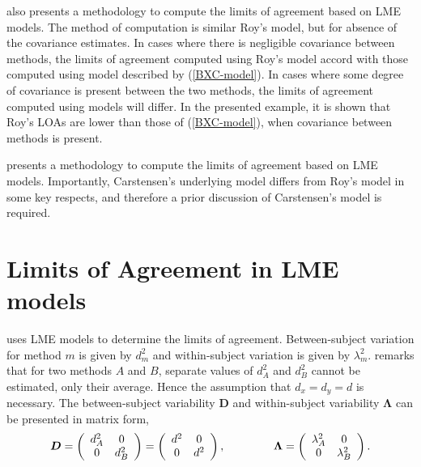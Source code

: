 \documentclass[12pt, a4paper]{report}
\theoremstyle{plain}
\theoremstyle{definition}
\theoremstyle{remark}
\begin{document}
\bigskip

\citet{BXC2008} also presents a methodology to compute the limits of agreement based on LME models. The method of computation is similar Roy's model, but for absence of the covariance estimates. In cases where there is negligible covariance between methods, the limits of agreement computed using Roy's model accord with those computed using model described by (\ref{BXC-model}). In cases where some degree of covariance is present between the two methods, the limits of agreement computed using models will differ. In the presented example, it is shown that Roy's LOAs are lower than those of (\ref{BXC-model}), when covariance between methods is present.

\bigskip

\citet{BXC2008} presents a methodology to compute the limits of
agreement based on LME models. Importantly, Carstensen's underlying model differs from Roy's model in some key respects, and therefore a prior discussion of Carstensen's model is required.



\section{Limits of Agreement in LME models}
\citet{BXC2008} uses LME models to determine the limits of agreement. Between-subject variation for method $m$ is given by $d^2_{m}$ and within-subject variation is given by $\lambda^2_{m}$.  \citet{BXC2008} remarks that for two methods $A$ and $B$, separate values of $d^2_{A}$ and $d^2_{B}$ cannot be estimated, only their average. Hence the assumption that $d_{x}= d_{y}= d$ is necessary. The between-subject variability $\boldsymbol{D}$ and within-subject variability $\boldsymbol{\Lambda}$ can be presented in matrix form,\[
\boldsymbol{D} = \left(%
\begin{array}{cc}
d^2_{A}& 0 \\
0 & d^2_{B} \\
\end{array}%
\right)=\left(%
\begin{array}{cc}
d^2& 0 \\
0 & d^2\\
\end{array}%
\right),
\hspace{1.5cm}
\boldsymbol{\Lambda} = \left(%
\begin{array}{cc}
\lambda^2_{A}& 0 \\
0 & \lambda^2_{B} \\
\end{array}%
\right).
\]
\end{document}
